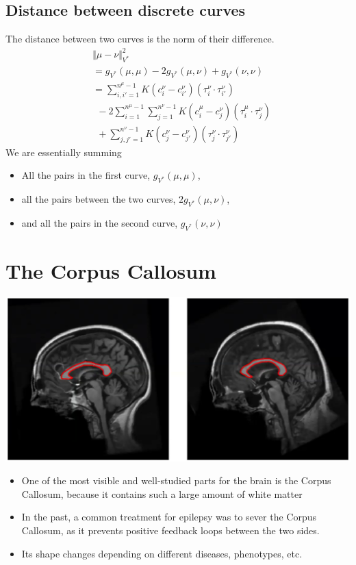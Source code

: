 \documentclass[10pt]{article}
\begin{document}
\subsection*{Distance between discrete curves}
The distance between two curves is the norm of their difference.
\begin{align*}
    &\Vert \mu - \nu \Vert^2_{V^*}\\
    &= g_{V^*}(\mu, \mu) - 2g_{V^*}(\mu, \nu) + g_{V^*}(\nu, \nu)\\
    &= \sum_{i, i' = 1}^{n^\mu - 1} K(c_i^\nu - c_{i'}^\nu)(\tau_i^\nu \cdot \tau_{i'}^\nu) \\
    &~~- 2 \sum_{i = 1}^{n^\mu - 1} \sum_{j = 1}^{n^\nu - 1} K(c_i^\mu - c_j^\nu)(\tau_i^\mu \cdot \tau_j^\nu)\\
    &~~+ \sum_{j, j' = 1}^{n^\nu - 1} K(c_j^\nu - c_{j'}^\nu)(\tau_j^\nu \cdot \tau_{j'}^\nu)
\end{align*}
We are essentially summing
\begin{itemize}
    \item All the pairs in the first curve, $g_{V^*}(\mu, \mu)$,
    \item all the pairs between the two curves, $2g_{V^*}(\mu, \nu)$,
    \item and all the pairs in the second curve, $g_{V^*}(\nu, \nu)$
\end{itemize}


\section*{The Corpus Callosum}
\begin{center}
    \includegraphics*[width=\textwidth]{W4_2.png}
\end{center}
\begin{itemize}
    \item One of the most visible and well-studied parts for the brain is the Corpus Callosum, because it contains such a large amount of white matter
    \item In the past, a common treatment for epilepsy was to sever the Corpus Callosum, as it prevents positive feedback loops between the two sides.
    \item Its shape changes depending on different diseases, phenotypes, etc.
\end{itemize}
\end{document}
